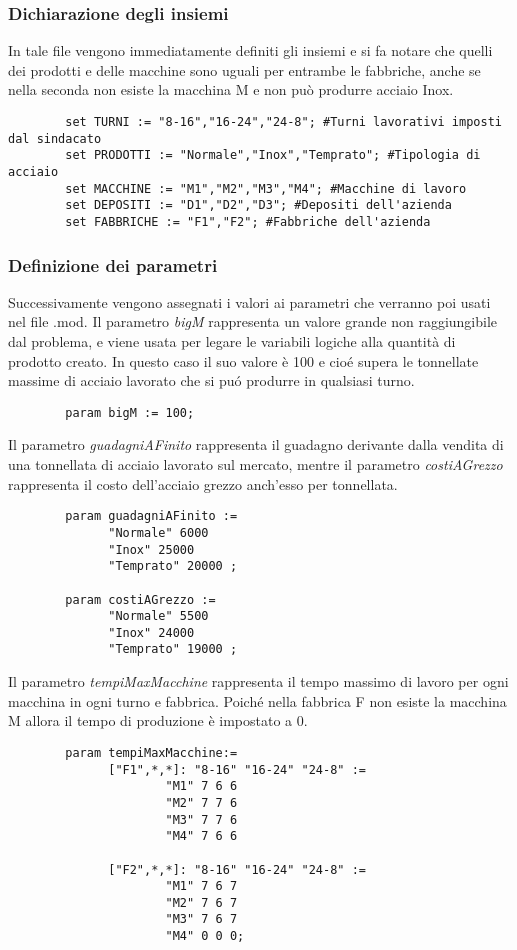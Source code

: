 \documentclass[12pt]{article} %
\begin{document}
	\subsubsection{Dichiarazione degli insiemi}
		In tale file vengono immediatamente definiti gli insiemi e si fa notare che quelli dei prodotti e delle macchine sono uguali per entrambe le fabbriche, anche se nella seconda non esiste la macchina M e non può produrre acciaio Inox.
		\begin{lstlisting}
		set TURNI := "8-16","16-24","24-8"; #Turni lavorativi imposti dal sindacato
		set PRODOTTI := "Normale","Inox","Temprato"; #Tipologia di acciaio
		set MACCHINE := "M1","M2","M3","M4"; #Macchine di lavoro
		set DEPOSITI := "D1","D2","D3"; #Depositi dell'azienda
		set FABBRICHE := "F1","F2"; #Fabbriche dell'azienda
		\end{lstlisting}

	\subsubsection{Definizione dei parametri}
		Successivamente vengono assegnati i valori ai parametri che verranno poi usati nel file .mod.
		Il parametro \textit{bigM} rappresenta un valore grande non raggiungibile dal problema, e viene usata per legare le variabili logiche alla quantità di prodotto creato. In questo caso il suo valore è 100 e cio\'e supera le tonnellate massime di acciaio lavorato che si pu\'o produrre in qualsiasi turno.
		\begin{lstlisting}
		param bigM := 100;
		\end{lstlisting}

		Il parametro \textit{guadagniAFinito} rappresenta il guadagno derivante dalla vendita di una tonnellata di acciaio lavorato sul mercato, mentre il parametro \textit{costiAGrezzo} rappresenta il costo dell'acciaio grezzo anch'esso per tonnellata.
		\begin{lstlisting}
		param guadagniAFinito :=
		      "Normale" 6000
		      "Inox" 25000
		      "Temprato" 20000 ;

		param costiAGrezzo := 
		      "Normale" 5500
		      "Inox" 24000
		      "Temprato" 19000 ;
		\end{lstlisting}

		Il parametro \textit{tempiMaxMacchine} rappresenta il tempo massimo di lavoro per ogni macchina in ogni turno e fabbrica. 
		Poich\'e nella fabbrica F non esiste la macchina M allora il tempo di produzione è impostato a 0.
		\begin{lstlisting}
		param tempiMaxMacchine:=	
		      ["F1",*,*]: "8-16" "16-24" "24-8" :=
		              "M1" 7 6 6
		      	      "M2" 7 7 6
		      	      "M3" 7 7 6
		      	      "M4" 7 6 6 

		      ["F2",*,*]: "8-16" "16-24" "24-8" :=
		      	      "M1" 7 6 7
		      	      "M2" 7 6 7
		      	      "M3" 7 6 7
			          "M4" 0 0 0;
		\end{lstlisting}
\end{document}
